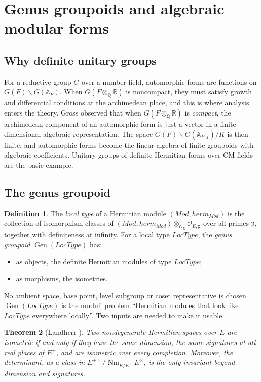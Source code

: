 \documentclass[11pt]{amsart}
\newtheorem{theorem}{Theorem}[section]
\theoremstyle{definition}
\newtheorem{definition}[theorem]{Definition}
\theoremstyle{remark}
\newcommand{\OEring}{\mathcal{O}_E}
\newcommand{\Md}{\mathit{Mod}}
\newcommand{\herm}{\mathit{herm}}
\newcommand{\LocType}{\mathit{LocType}}
\DeclareMathOperator{\Gen}{Gen}
\DeclareMathOperator{\Nm}{Nm}
\newcommand{\A}{\mathbb{A}}
\newcommand{\Q}{\mathbb{Q}}
\newcommand{\R}{\mathbb{R}}
\newcommand{\pp}{\mathfrak{p}}
\begin{document}
\section{Genus groupoids and algebraic modular forms}\label{sec:genus}

\subsection{Why definite unitary groups}
For a reductive group $G$ over a number field, automorphic forms are functions on $G(F)\backslash G(\A_F)$. When $G(F\otimes_{\Q}\R)$ is noncompact, they must satisfy growth and differential conditions at the archimedean place, and this is where analysis enters the theory. Gross observed \cite{Gross-AMF} that when $G(F\otimes_{\Q}\R)$ is \emph{compact}, the archimedean component of an automorphic form is just a vector in a finite-dimensional algebraic representation. The space $G(F)\backslash G(\A_{F,f})/K$ is then finite, and automorphic forms become the linear algebra of finite groupoids with algebraic coefficients. Unitary groups of definite Hermitian forms over CM fields are the basic example.

\subsection{The genus groupoid}
\begin{definition}\label{def:genus}
The \emph{local type} of a Hermitian module $(\Md,\herm_\Md)$ is the collection of isomorphism classes of $(\Md,\herm_\Md)\otimes_{\OEring}\mathcal{O}_{E,\pp}$ over all primes $\pp$, together with definiteness at infinity. For a local type $\LocType$, the \emph{genus groupoid} $\Gen(\LocType)$ has:
\begin{itemize}
\item as objects, the definite Hermitian modules of type $\LocType$;
\item as morphisms, the isometries.
\end{itemize}
\end{definition}

No ambient space, base point, level subgroup or coset representative is chosen. $\Gen(\LocType)$ is the moduli problem ``Hermitian modules that look like $\LocType$ everywhere locally''. Two inputs are needed to make it usable.

\begin{theorem}[Landherr \cite{Landherr}]\label{thm:landherr}
Two nondegenerate Hermitian spaces over $E$ are isometric if and only if they have the same dimension, the same signatures at all real places of $E^+$, and are isometric over every completion. Moreover, the determinant, as a class in $E^{+\times}/\Nm_{E/E^+}E^\times$, is the only invariant beyond dimension and signatures.
\end{theorem}
\end{document}
